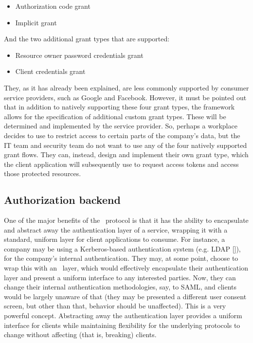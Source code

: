 \begin{itemize}
    \item Authorization code grant
    \item Implicit grant
\end{itemize}

\noindent And the two additional grant types that are supported:

\begin{itemize}
    \item Resource owner password credentials grant
    \item Client credentials grant
\end{itemize}

\noindent They, as it has already been explained, are less commonly supported by consumer service providers, such as Google and Facebook. However, it must be pointed out that in addition to natively supporting these four grant types, the \textit{\oauth} framework allows for the specification of additional custom grant types. These will be determined and implemented by the service provider. So, perhaps a workplace decides to use \textit{\oauth} to restrict access to certain parts of the company's data, but the IT team and security team do not want to use any of the four natively supported grant flows. They can, instead, design and implement their own grant type, which the client application will subsequently use to request access tokens and access those protected resources.

\subsection{Authorization backend}
One of the major benefits of the \oauth\ protocol is that it has the ability to encapsulate and abstract away the authentication layer of a service, wrapping it with a standard, uniform layer for client applications to consume. For instance, a company may be using a Kerberos-based authentication system (e.g. LDAP []), for the company's internal authentication. They may, at some point, choose to wrap this with an \oauth\ layer, which would effectively encapsulate their authentication layer and present a uniform interface to any interested parties. Now, they can change their internal authentication methodologies, say, to SAML, and clients would be largely unaware of that (they may be presented a different user consent screen, but other than that, behavior should be unaffected). This is a very powerful concept. Abstracting away the authentication layer provides a uniform interface for clients while maintaining flexibility for the underlying protocols to change without affecting (that is, breaking) clients.

